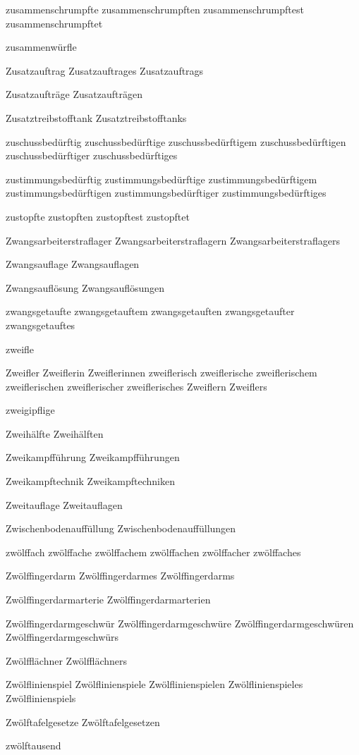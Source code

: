 zusammenschrumpfte
zusammenschrumpften
zusammenschrumpftest
zusammenschrumpftet

zusammenwürfle

Zusatzauftrag
Zusatzauftrages
Zusatzauftrags

Zusatzaufträge
Zusatzaufträgen

Zusatztreibstofftank
Zusatztreibstofftanks

zuschussbedürftig
zuschussbedürftige
zuschussbedürftigem
zuschussbedürftigen
zuschussbedürftiger
zuschussbedürftiges

zustimmungsbedürftig
zustimmungsbedürftige
zustimmungsbedürftigem
zustimmungsbedürftigen
zustimmungsbedürftiger
zustimmungsbedürftiges

zustopfte
zustopften
zustopftest
zustopftet

Zwangsarbeiterstraflager
Zwangsarbeiterstraflagern
Zwangsarbeiterstraflagers

Zwangsauflage
Zwangsauflagen

Zwangsauflösung
Zwangsauflösungen

zwangsgetaufte
zwangsgetauftem
zwangsgetauften
zwangsgetaufter
zwangsgetauftes

zweifle

Zweifler
Zweiflerin
Zweiflerinnen
zweiflerisch
zweiflerische
zweiflerischem
zweiflerischen
zweiflerischer
zweiflerisches
Zweiflern
Zweiflers

zweigipflige

Zweihälfte
Zweihälften

Zweikampfführung
Zweikampfführungen

Zweikampftechnik
Zweikampftechniken

Zweitauflage
Zweitauflagen

Zwischenbodenauffüllung
Zwischenbodenauffüllungen

zwölffach
zwölffache
zwölffachem
zwölffachen
zwölffacher
zwölffaches

Zwölffingerdarm
Zwölffingerdarmes
Zwölffingerdarms

Zwölffingerdarmarterie
Zwölffingerdarmarterien

Zwölffingerdarmgeschwür
Zwölffingerdarmgeschwüre
Zwölffingerdarmgeschwüren
Zwölffingerdarmgeschwürs

Zwölfflächner
Zwölfflächners

Zwölflinienspiel
Zwölflinienspiele
Zwölflinienspielen
Zwölflinienspieles
Zwölflinienspiels

Zwölftafelgesetze
Zwölftafelgesetzen

zwölftausend

